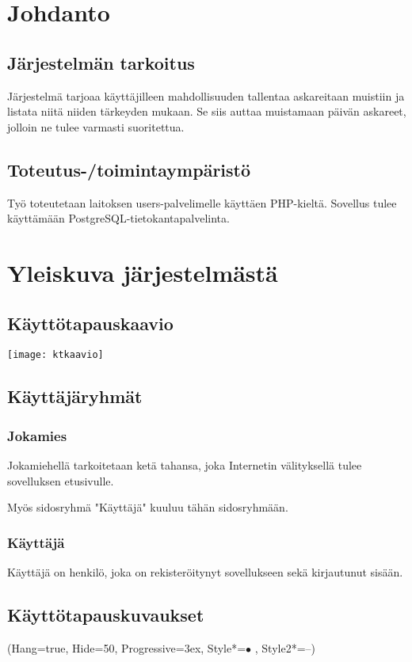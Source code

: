 \documentclass{report}
\begin{document}
\section*{Johdanto}
\subsection*{Järjestelmän tarkoitus}
Järjestelmä tarjoaa käyttäjilleen mahdollisuuden tallentaa askareitaan muistiin ja listata niitä niiden tärkeyden mukaan. Se siis auttaa muistamaan päivän askareet, jolloin ne tulee varmasti suoritettua.

\subsection*{Toteutus-/toimintaympäristö}
Työ toteutetaan laitoksen users-palvelimelle käyttäen PHP-kieltä. Sovellus tulee käyttämään PostgreSQL-tietokantapalvelinta.

\section*{Yleiskuva järjestelmästä}
\subsection*{Käyttötapauskaavio}
\texttt{[image: ktkaavio]}

\subsection*{Käyttäjäryhmät}
\subsubsection*{Jokamies}
Jokamiehellä tarkoitetaan ketä tahansa, joka Internetin välityksellä tulee sovelluksen etusivulle. 

Myös sidosryhmä "Käyttäjä" kuuluu tähän sidosryhmään.

\subsubsection*{Käyttäjä}
Käyttäjä on henkilö, joka on rekisteröitynyt sovellukseen sekä kirjautunut sisään.

\subsection*{Käyttötapauskuvaukset}
\ListProperties(Hang=true, Hide=50, Progressive=3ex, Style*=$\bullet$ , Style2*=--)
\end{document}
